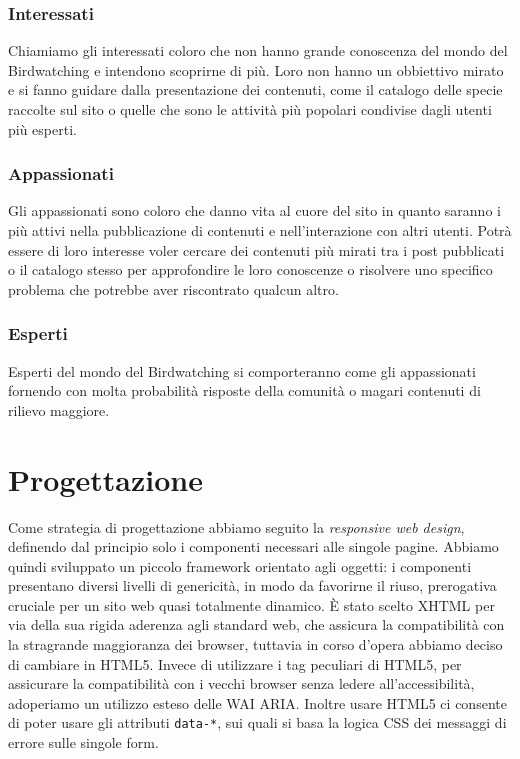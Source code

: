 \documentclass[12pt, a4paper]{article}
\begin{document}
    \subsubsection{Interessati}
    Chiamiamo gli interessati coloro che non hanno grande conoscenza del mondo del Birdwatching e intendono scoprirne di più.
    Loro non hanno un obbiettivo mirato e si fanno guidare dalla presentazione dei contenuti, come il catalogo delle specie
    raccolte sul sito o quelle che sono le attività più popolari condivise dagli utenti più esperti.
    \subsubsection{Appassionati}
    Gli appassionati sono coloro che danno vita al cuore del sito in quanto saranno i più attivi nella pubblicazione
    di contenuti e nell'interazione con altri utenti.
    Potrà essere di loro interesse voler cercare dei contenuti più mirati tra i post pubblicati o il catalogo stesso
    per approfondire le loro conoscenze o risolvere uno specifico problema che potrebbe aver riscontrato qualcun altro.
    
    \subsubsection{Esperti}
    Esperti del mondo del Birdwatching si comporteranno come gli appassionati fornendo con molta probabilità risposte
    della comunità o magari contenuti di rilievo maggiore.

    \section{Progettazione}
    Come strategia di progettazione abbiamo seguito la \textit{responsive web design}, definendo dal principio solo i componenti necessari alle singole pagine. Abbiamo quindi sviluppato un piccolo framework orientato agli oggetti: i componenti presentano diversi livelli di genericità, in modo da favorirne il riuso, prerogativa cruciale per un sito web quasi totalmente dinamico.
    È stato scelto XHTML per via della sua rigida aderenza agli standard web, che assicura la compatibilità con la stragrande maggioranza dei browser, tuttavia in corso d'opera abbiamo deciso di cambiare in HTML5. Invece di utilizzare i tag peculiari di HTML5, per assicurare la compatibilità con i vecchi browser senza ledere all'accessibilità, adoperiamo un utilizzo esteso delle WAI ARIA. Inoltre usare HTML5 ci consente di poter usare gli attributi \texttt{data-*}, sui quali si basa la logica CSS dei messaggi di errore sulle singole form.
\end{document}
